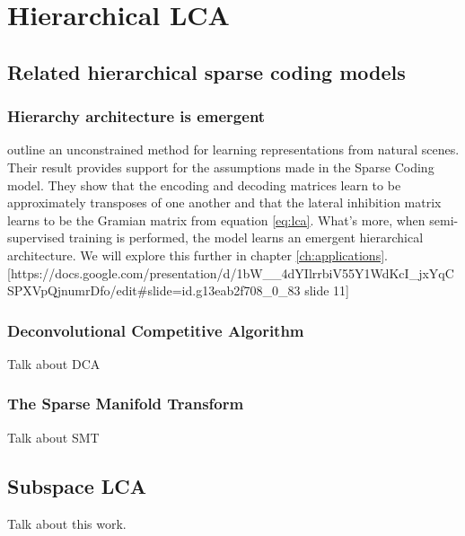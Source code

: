 \chapter{Hierarchical LCA}


\section{Related hierarchical sparse coding models}


\subsection{Hierarchy architecture is emergent}
\citet{rolfe2013discriminative} outline an unconstrained method for learning representations from natural scenes. Their result provides support for the assumptions made in the Sparse Coding model. They show that the encoding and decoding matrices learn to be approximately transposes of one another and that the lateral inhibition matrix learns to be the Gramian matrix from equation \ref{eq:lca}. What's more, when semi-supervised training is performed, the model learns an emergent hierarchical architecture. We will explore this further in chapter \ref{ch:applications}.
[https://docs.google.com/presentation/d/1bW__4dYIlrrbiV55Y1WdKcI_jxYqCSPXVpQjnumrDfo/edit#slide=id.g13eab2f708_0_83 slide 11]


\subsection{Deconvolutional Competitive Algorithm}
Talk about DCA


\subsection{The Sparse Manifold Transform}
Talk about SMT


\section{Subspace LCA}
Talk about this work.